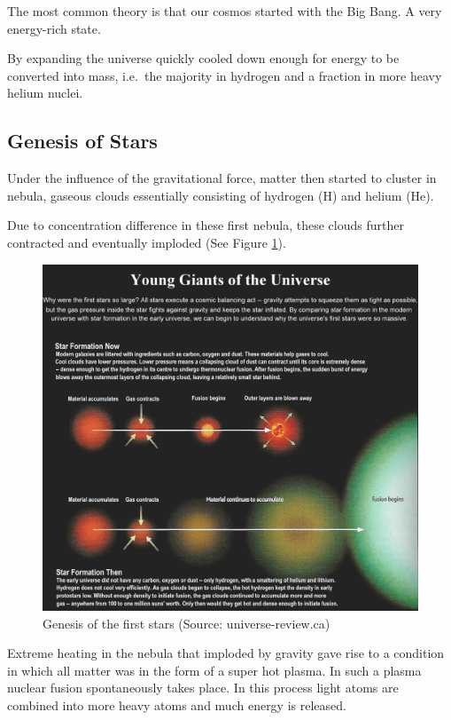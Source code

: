 \documentclass[
  11pt,
]{book}
\begin{document}
The most common theory is that our cosmos started with the Big Bang.
A very energy-rich state.

By expanding the universe quickly cooled down enough for energy to be converted into mass, i.e.~the majority in hydrogen and a fraction in more heavy helium nuclei.

\hypertarget{genesis-of-stars}{%
\subsection{Genesis of Stars}\label{genesis-of-stars}}

Under the influence of the gravitational force, matter then started to cluster in nebula, gaseous clouds essentially consisting of hydrogen (H) and helium (He).

Due to concentration difference in these first nebula, these clouds further contracted and eventually imploded (See Figure \ref{fig:genesisStar}).

\begin{figure}

{\centering \includegraphics[width=1\linewidth]{./figs/I08-13-firststars6} 

}

\caption{Genesis of the first stars (Source: universe-review.ca)}\label{fig:genesisStar}
\end{figure}

Extreme heating in the nebula that imploded by gravity gave rise to a condition in which all matter was in the form of a super hot plasma.
In such a plasma nuclear fusion spontaneously takes place. In this process light atoms are combined into more heavy atoms and much energy is released.
\end{document}
